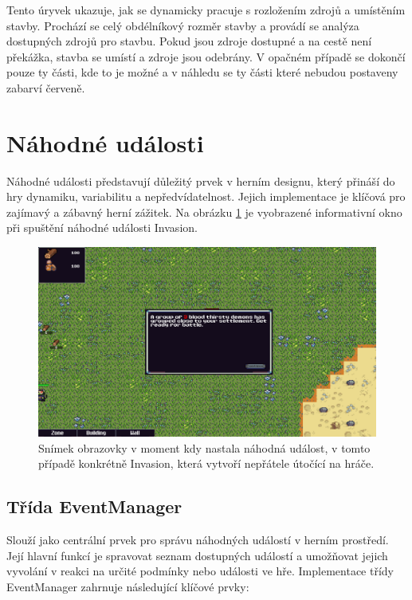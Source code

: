 Tento úryvek ukazuje, jak se dynamicky pracuje s rozložením zdrojů a umístěním stavby. Prochází se celý obdélníkový rozměr stavby a provádí se analýza dostupných zdrojů pro stavbu. Pokud jsou zdroje dostupné a na cestě není překážka, stavba se umístí a zdroje jsou odebrány. V opačném případě se dokončí pouze ty části, kde to je možné a v náhledu se ty části které nebudou postaveny zabarví červeně.

\section{Náhodné události}
Náhodné události představují důležitý prvek v herním designu, který přináší do hry dynamiku, variabilitu a nepředvídatelnost. Jejich implementace je klíčová pro zajímavý a zábavný herní zážitek. Na obrázku \ref{RandomEvent} je vyobrazené informativní okno při spuštění náhodné události Invasion.

\begin{figure}[H]
	\centering
	\includegraphics[scale=0.55]{obrazky-figures/RandomEventPicture.png}
	\caption{Snímek obrazovky v moment kdy nastala náhodná událost, v tomto případě konkrétně Invasion, která vytvoří nepřátele útočící na hráče.}
	\label{RandomEvent}
\end{figure}

\subsection{Třída EventManager}
Slouží jako centrální prvek pro správu náhodných událostí v herním prostředí. Její hlavní funkcí je spravovat seznam dostupných událostí a umožňovat jejich vyvolání v reakci na určité podmínky nebo události ve hře. Implementace třídy EventManager zahrnuje následující klíčové prvky:

